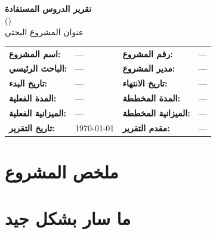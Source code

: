 \documentclass[11pt,a4paper]{article}
\begin{document}
\begin{center}
{\LARGE\bfseries تقرير الدروس المستفادة}\\[0.3em]
{\Large ()}\\[0.5em]
{\large عنوان المشروع البحثي}\\[1em]
\end{center}

\begin{table}[H]
\centering
\renewcommand{\arraystretch}{1.4}
\begin{tabularx}{\textwidth}{L{4cm} X L{4cm} X}
\toprule
\textbf{اسم المشروع:} & --- & \textbf{رقم المشروع:} & --- \\
\textbf{الباحث الرئيسي:} & --- & \textbf{مدير المشروع:} & --- \\
\textbf{تاريخ البدء:} & --- & \textbf{تاريخ الانتهاء:} & --- \\
\textbf{المدة الفعلية:} & --- & \textbf{المدة المخططة:} & --- \\
\textbf{الميزانية الفعلية:} & --- & \textbf{الميزانية المخططة:} & --- \\
\textbf{تاريخ التقرير:} & \today & \textbf{مقدم التقرير:} & --- \\
\bottomrule
\end{tabularx}
\end{table}

\vspace{1em}

\section{ملخص المشروع}
\label{sec:summary}

\vspace{3em}

\section{ما سار بشكل جيد}
\label{sec:good}
\end{document}
